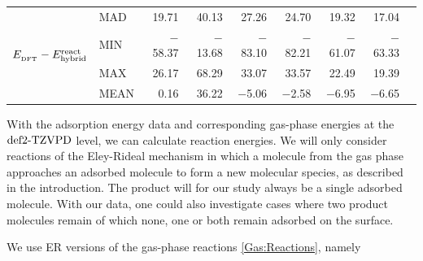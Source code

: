 \documentclass[8.5pt,twoside,twocolumn]{article}
\newcommand\zpe{\enmat{\te{ZPE}}}
\newcommand\dft{\enmat{_{\te{DFT}}}}
\newcommand\gas{\enmat{_\te{(g)}}}
\newcommand{\fakefna}{\enmat{^a}}
\newcommand\kmo{\enmat{\te {kJ/mol}}}
\theoremstyle{standard}
\begin{document}
\begin{table}[htb]
\begin{tabular}{lll|rrrrrr|r}
    \hline \hline
\multicolumn{2}{r|}{\multirow{4}{*}{$E_{\dft} - \erehyb$}} &
                            MAD   & 19.71 & 40.13 & 27.26 & 24.70 & 19.32 & 17.04 &  \\
    \multicolumn{2}{r|}{} &  MIN   & $-$58.37 & $-$13.68 & $-$83.10 & $-$82.21 & $-$61.07 & $-$63.33 &  \\
    \multicolumn{2}{r|}{} &  MAX   & 26.17 & 68.29 & 33.07 & 33.57 & 22.49 & 19.39 &  \\
    \multicolumn{2}{r|}{} &  MEAN  & 0.16  & 36.22 & $-$5.06 & $-$2.58 & $-$6.95 & $-$6.65 &  \\[5pt]
%
%
    \end{tabular}%
  \label{Tab:Ads:React}%
\end{table}%


With the adsorption energy data and corresponding gas-phase energies at the
$\text{def2-TZVPD}$ level, we can calculate reaction energies. We will only
consider reactions of the Eley-Rideal mechanism in which a molecule
from the gas phase approaches an adsorbed molecule to form
a new molecular species, as described in the introduction.
The product will for our study always be a single adsorbed molecule. With our data,
one could also investigate cases where two product molecules remain
of which none, one or both remain adsorbed on the surface.

We use ER versions of the gas-phase reactions \eqref{Gas:Reactions}, namely
\end{document}
